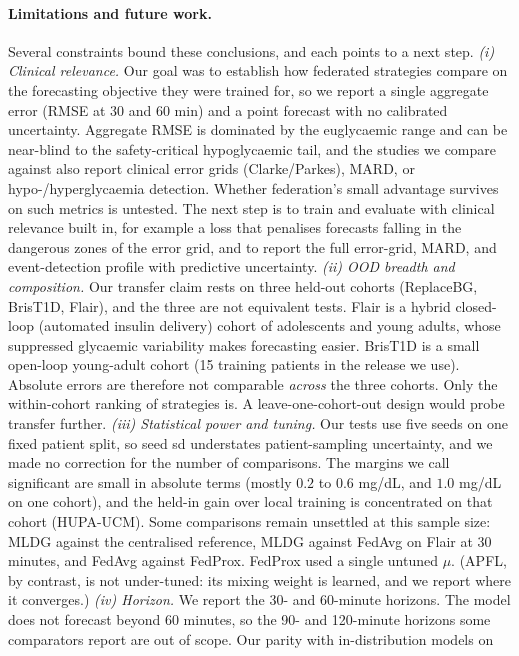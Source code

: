 \documentclass[10pt,letterpaper]{article}
\begin{document}
\paragraph{Limitations and future work.} Several constraints bound these
conclusions, and each points to a next step.
\emph{(i) Clinical relevance.} Our goal was to establish how federated
strategies compare on the forecasting objective they were trained for, so we
report a single aggregate error (RMSE at 30 and 60 min) and a point forecast with no
calibrated uncertainty. Aggregate RMSE is dominated by the euglycaemic range and
can be near-blind to the safety-critical hypoglycaemic tail, and the studies we
compare against also report clinical error grids (Clarke/Parkes), MARD, or
hypo-/hyperglycaemia detection. Whether federation's small advantage survives
on such metrics is untested. The next step is to train and evaluate with clinical
relevance built in, for example a loss that penalises forecasts falling in
the dangerous zones of the error grid, and to report the full error-grid,
MARD, and event-detection profile with predictive uncertainty.
\emph{(ii) OOD breadth and composition.} Our transfer claim rests on three
held-out cohorts (ReplaceBG, BrisT1D, Flair), and the three are not equivalent
tests. Flair is a hybrid closed-loop (automated insulin delivery) cohort of
adolescents and young adults, whose suppressed glycaemic variability makes
forecasting easier. BrisT1D is a small open-loop young-adult cohort (15
training patients in the release we use). Absolute errors are therefore not comparable \emph{across} the three
cohorts. Only the within-cohort ranking of strategies is. A leave-one-cohort-out
design would probe transfer further.
\emph{(iii) Statistical power and tuning.} Our tests use five seeds on one
fixed patient split, so seed sd understates patient-sampling uncertainty,
and we made no correction for the number of comparisons. The margins we call
significant are small in absolute terms (mostly $0.2$ to $0.6$ mg/dL, and
$1.0$ mg/dL on one cohort), and the held-in gain over local training is
concentrated on that cohort (HUPA-UCM).
Some comparisons remain unsettled at this sample size: MLDG against the
centralised reference, MLDG against FedAvg on Flair at 30 minutes, and
FedAvg against FedProx. FedProx used a single untuned $\mu$. (APFL, by
contrast, is not under-tuned: its mixing weight is learned, and we report
where it converges.)
\emph{(iv) Horizon.} We report the 30- and 60-minute horizons. The model does
not forecast beyond 60 minutes, so the 90- and 120-minute horizons some
comparators report are out of scope. Our parity with in-distribution models on
\end{document}
